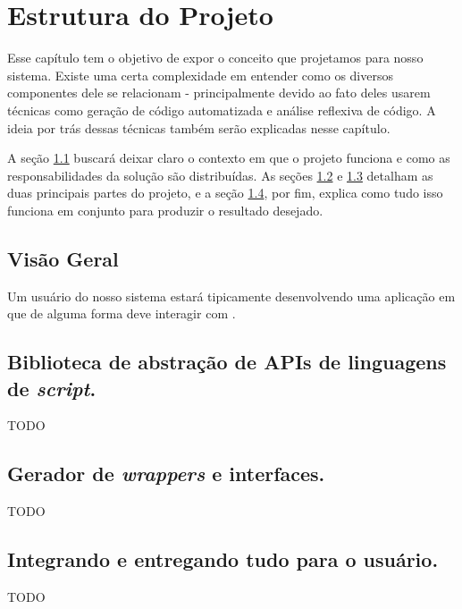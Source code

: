 \chapter{Estrutura do Projeto}
\label{sec:estrutura}

Esse capítulo tem o objetivo de expor o conceito que projetamos para nosso
sistema. Existe uma certa complexidade em entender como os diversos componentes
dele se relacionam - principalmente devido ao fato deles usarem técnicas como
geração de código automatizada e análise reflexiva de código. A ideia por trás
dessas técnicas também serão explicadas nesse capítulo.

A seção \ref{sec:estrutura:geral} buscará deixar
claro o contexto em que o projeto funciona e como as responsabilidades da
solução são distribuídas. As seções \ref{sec:estrutura:opa} e
\ref{sec:estrutura:opwig} detalham as duas principais partes do projeto, e a
seção \ref{sec:estrutura:integration}, por fim, explica como tudo isso funciona
em conjunto para produzir o resultado desejado.

\section{Visão Geral}
\label{sec:estrutura:geral}

Um usuário do nosso sistema estará tipicamente desenvolvendo uma aplicação em
\cxx{} que de alguma forma deve interagir com .

\section{Biblioteca de abstração de APIs de linguagens de \emph{script}.}
\label{sec:estrutura:opa}
TODO

\section{Gerador de \emph{wrappers} e interfaces.}
\label{sec:estrutura:opwig}
TODO

\section{Integrando e entregando tudo para o usuário.}
\label{sec:estrutura:integration}
TODO
